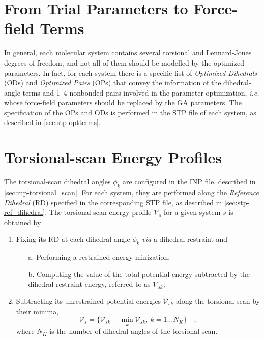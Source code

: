 \documentclass[10pt,a4paper]{report}
\numberwithin{equation}{section}
\begin{document}
\section{From Trial Parameters to Force-field Terms}
\label{sec:ga-opt-control}

In general, each molecular system contains several torsional and
Lennard-Jones degrees of freedom, and not all of them should be
modelled by the optimized parameters. In fact, for each system there
is a specific list of \textit{Optimized Dihedrals} (ODs) and
\textit{Optimized Pairs} (OPs) that convey the information of the
dihedral-angle terms and 1--4 nonbonded pairs involved in the
parameter optimization, \textit{i.e.} whose force-field parameters
should be replaced by the GA parameters. The specification of the OPs
and ODs is performed in the STP file of each system, as described in
\autoref{sec:stp-optterms}.

\section{Torsional-scan Energy Profiles}
\label{sec:ga-tpes}

The torsional-scan dihedral angles $\phi_k$ are configured in the INP
file, described in \autoref{sec:inp-torsional_scan}. For each system,
they are performed along the \textit{Reference
  Dihedral} (RD) specified in the corresponding STP file, as described in
\autoref{sec:stp-ref_dihedral}.
The torsional-scan energy profile $\mathcal{V}_s$ for a given system $s$ is obtained by
\begin{enumerate}
\item Fixing its RD at each dihedral angle $\phi_k$ \textit{via} a dihedral restraint and
\begin{enumerate}
\item [a.] Performing a restrained energy minization;
\item [b.] Computing the value of the total potential energy subtracted by the
  dihedral-restraint energy, referred to as $\mathcal{V}_{sk}$;
\end{enumerate}
\item Subtracting its unrestrained potential energies
  $\mathcal{V}_{sk}$ along the torsional-scan by their minima,
  \begin{equation}
  \label{eq:ga-tors-scan}
  \mathcal{V}_s = \{ \mathcal{V}_{sk} - \min_k{\mathcal{V}_{sk}},\ k=1\ldots N_K \} \quad ,
\end{equation}
where $N_K$ is the number of dihedral angles of the torsional scan.
\end{enumerate}
\end{document}
